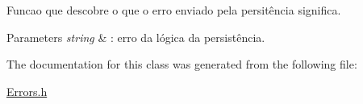Funcao que descobre o que o erro enviado pela persitência significa. 


\begin{DoxyParams}{Parameters}
{\em string} & \-: erro da lógica da persistência. \\
\hline
\end{DoxyParams}


The documentation for this class was generated from the following file\-:\begin{DoxyCompactItemize}
\item 
\hyperlink{_errors_8h}{Errors.\-h}\end{DoxyCompactItemize}
